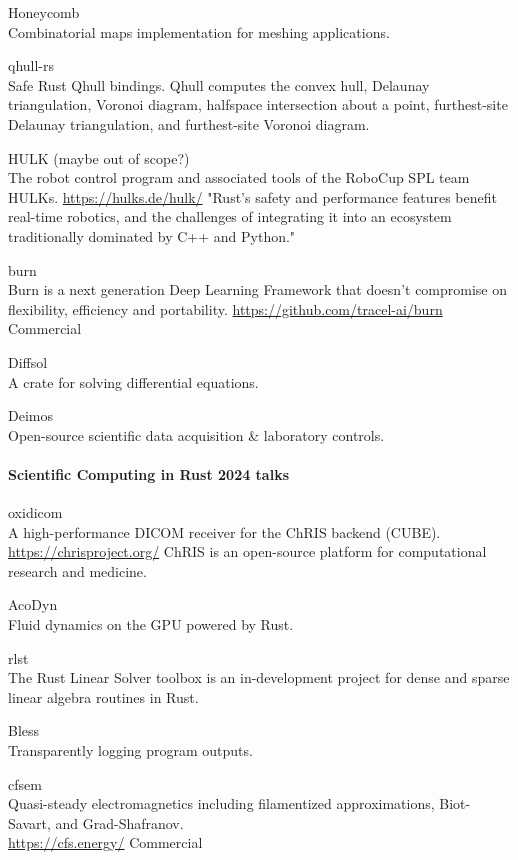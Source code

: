 \documentclass{article}
\begin{document}
Honeycomb\\
Combinatorial maps implementation for meshing applications.

qhull-rs\\
Safe Rust Qhull bindings. Qhull computes the convex hull, Delaunay triangulation,
Voronoi diagram, halfspace intersection about a point, furthest-site Delaunay triangulation, and
furthest-site Voronoi diagram.

HULK (maybe out of scope?)\\
The robot control program and associated tools of the RoboCup SPL team
HULKs. \url{https://hulks.de/hulk/} "Rust’s safety and performance features benefit real-time
robotics, and the challenges of integrating it into an ecosystem traditionally dominated by C++ and
Python."

burn\\
Burn is a next generation Deep Learning Framework that doesn't compromise on flexibility,
efficiency and portability. \url{https://github.com/tracel-ai/burn}\\
Commercial

Diffsol\\
A crate for solving differential equations.

Deimos\\
Open-source scientific data acquisition \& laboratory controls.

\paragraph{Scientific Computing in Rust 2024 talks}

oxidicom\\
A high-performance DICOM receiver for the ChRIS backend (CUBE).
\url{https://chrisproject.org/} ChRIS is an open-source platform for computational research and
medicine.

AcoDyn\\
Fluid dynamics on the GPU powered by Rust.

rlst\\
The Rust Linear Solver toolbox is an in-development project for dense and sparse linear
algebra routines in Rust.

Bless\\
Transparently logging program outputs.

cfsem\\
Quasi-steady electromagnetics including filamentized approximations, Biot-Savart, and
Grad-Shafranov.\\
\url{https://cfs.energy/} Commercial
\end{document}
